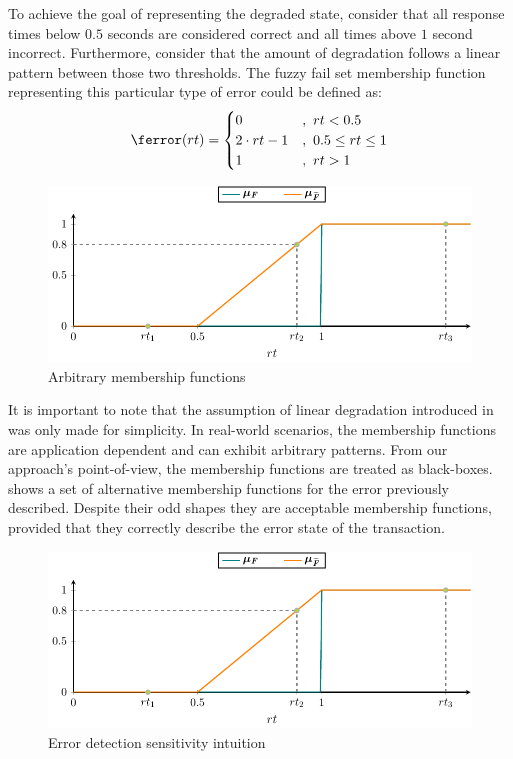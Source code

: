 To achieve the goal of representing the degraded state, consider that
all response times below $0.5$ seconds are considered correct and all
times above $1$ second incorrect.
%
Furthermore, consider that the amount of degradation follows a linear
pattern between those two thresholds.
%
The fuzzy fail set membership function representing this particular
type of error could be defined as:
\begin{equation}
  \label{eq:fuzzinel:fuzzy-error-fn}
  \ferror(rt) =
  \begin{cases}
    0       &,\ rt < 0.5 \\
    2 \cdot rt - 1 &,\ 0.5 \leq rt \leq 1 \\
    1       &,\ rt > 1
  \end{cases}
\end{equation}
%

\begin{figure}[!ht]
  \includegraphics[page=2]{figures/fuzzinel/figures/main.pdf}
  \caption{Arbitrary membership functions\label{fig:fuzzinel:arbitrary-error-fns}}
\end{figure}

It is important to note that the assumption of linear degradation
introduced in  was only made for
simplicity.
%
In real-world scenarios, the membership functions are application
dependent and can exhibit arbitrary patterns.
%
From our approach's point-of-view, the membership functions are
treated as black-boxes.
%
 shows a set of alternative
membership functions for the error previously described.
%
Despite their odd shapes they are acceptable membership functions,
provided that they correctly describe the error state of the
transaction.
%


\begin{figure}[!ht]
  \includegraphics[page=3]{figures/fuzzinel/figures/main.pdf}
  \caption{Error detection sensitivity intuition\label{fig:fuzzinel:sensitivity}}
\end{figure}

